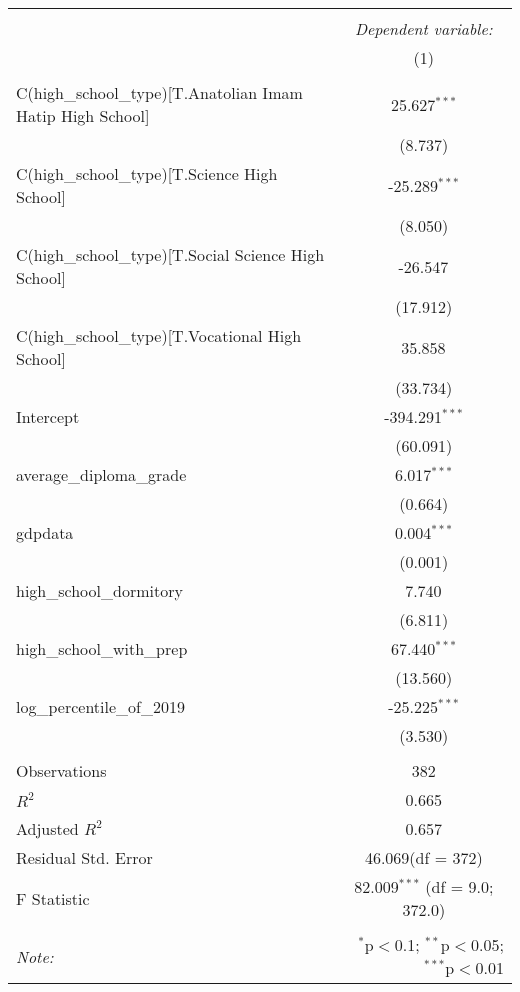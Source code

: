 \begin{table}[!htbp] \centering
\begin{tabular}{@{\extracolsep{5pt}}lc}
\\[-1.8ex]\hline
\hline \\[-1.8ex]
& \multicolumn{1}{c}{\textit{Dependent variable:}} \
\cr \cline{1-2}
\\[-1.8ex] & (1) \\
\hline \\[-1.8ex]
 C(high_school_type)[T.Anatolian Imam Hatip High School] & 25.627$^{***}$ \\
  & (8.737) \\
 C(high_school_type)[T.Science High School] & -25.289$^{***}$ \\
  & (8.050) \\
 C(high_school_type)[T.Social Science High School] & -26.547$^{}$ \\
  & (17.912) \\
 C(high_school_type)[T.Vocational High School] & 35.858$^{}$ \\
  & (33.734) \\
 Intercept & -394.291$^{***}$ \\
  & (60.091) \\
 average_diploma_grade & 6.017$^{***}$ \\
  & (0.664) \\
 gdpdata & 0.004$^{***}$ \\
  & (0.001) \\
 high_school_dormitory & 7.740$^{}$ \\
  & (6.811) \\
 high_school_with_prep & 67.440$^{***}$ \\
  & (13.560) \\
 log_percentile_of_2019 & -25.225$^{***}$ \\
  & (3.530) \\
\hline \\[-1.8ex]
 Observations & 382 \\
 $R^2$ & 0.665 \\
 Adjusted $R^2$ & 0.657 \\
 Residual Std. Error & 46.069(df = 372)  \\
 F Statistic & 82.009$^{***}$ (df = 9.0; 372.0) \\
\hline
\hline \\[-1.8ex]
\textit{Note:} & \multicolumn{1}{r}{$^{*}$p$<$0.1; $^{**}$p$<$0.05; $^{***}$p$<$0.01} \\
\end{tabular}
\end{table}